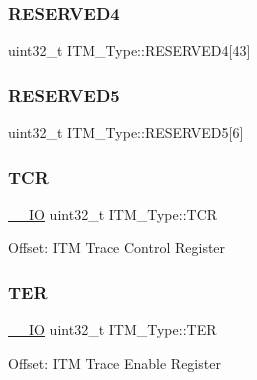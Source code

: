 \subsubsection{\texorpdfstring{RESERVED4}{RESERVED4}}
{\footnotesize\ttfamily uint32\+\_\+t I\+T\+M\+\_\+\+Type\+::\+R\+E\+S\+E\+R\+V\+E\+D4\mbox{[}43\mbox{]}}

\mbox{\label{struct_i_t_m___type_a7f70161bc2441d430b5c9d55aa7b7b5e}} 
\subsubsection{\texorpdfstring{RESERVED5}{RESERVED5}}
{\footnotesize\ttfamily uint32\+\_\+t I\+T\+M\+\_\+\+Type\+::\+R\+E\+S\+E\+R\+V\+E\+D5\mbox{[}6\mbox{]}}

\mbox{\label{struct_i_t_m___type_a58f169e1aa40a9b8afb6296677c3bb45}} 
\subsubsection{\texorpdfstring{TCR}{TCR}}
{\footnotesize\ttfamily \mbox{\hyperlink{group___c_m_s_i_s___c_m3__core__definitions_gaec43007d9998a0a0e01faede4133d6be}{\+\_\+\+\_\+\+IO}} uint32\+\_\+t I\+T\+M\+\_\+\+Type\+::\+T\+CR}

Offset\+: I\+TM Trace Control Register ~\newline
 \mbox{\label{struct_i_t_m___type_a91a040e1b162e1128ac1e852b4a0e589}} 
\subsubsection{\texorpdfstring{TER}{TER}}
{\footnotesize\ttfamily \mbox{\hyperlink{group___c_m_s_i_s___c_m3__core__definitions_gaec43007d9998a0a0e01faede4133d6be}{\+\_\+\+\_\+\+IO}} uint32\+\_\+t I\+T\+M\+\_\+\+Type\+::\+T\+ER}

Offset\+: I\+TM Trace Enable Register ~\newline
 \mbox{\label{struct_i_t_m___type_a93b480aac6da620bbb611212186d47fa}} 
